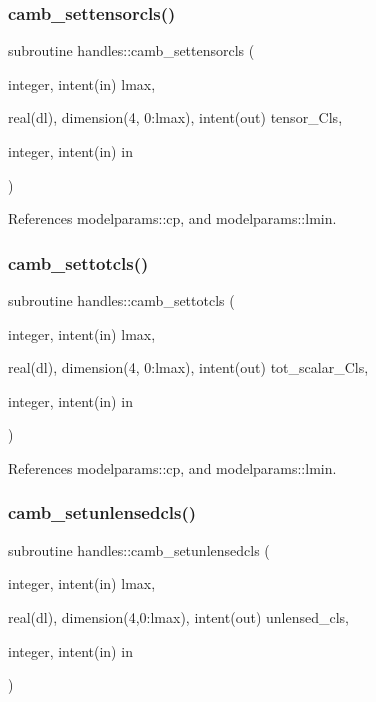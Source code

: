 \subsubsection{\texorpdfstring{camb\+\_\+settensorcls()}{camb\_settensorcls()}}
{\footnotesize\ttfamily subroutine handles\+::camb\+\_\+settensorcls (\begin{DoxyParamCaption}\item[{integer, intent(in)}]{lmax,  }\item[{real(dl), dimension(4, 0\+:lmax), intent(out)}]{tensor\+\_\+\+Cls,  }\item[{integer, intent(in)}]{in }\end{DoxyParamCaption})}



References modelparams\+::cp, and modelparams\+::lmin.

\mbox{\label{namespacehandles_aa9ec681801ce104b28add54fd9ee3d16}} 
\subsubsection{\texorpdfstring{camb\+\_\+settotcls()}{camb\_settotcls()}}
{\footnotesize\ttfamily subroutine handles\+::camb\+\_\+settotcls (\begin{DoxyParamCaption}\item[{integer, intent(in)}]{lmax,  }\item[{real(dl), dimension(4, 0\+:lmax), intent(out)}]{tot\+\_\+scalar\+\_\+\+Cls,  }\item[{integer, intent(in)}]{in }\end{DoxyParamCaption})}



References modelparams\+::cp, and modelparams\+::lmin.

\mbox{\label{namespacehandles_a275c2c9c895b79f63eef42b7fe81c842}} 
\subsubsection{\texorpdfstring{camb\+\_\+setunlensedcls()}{camb\_setunlensedcls()}}
{\footnotesize\ttfamily subroutine handles\+::camb\+\_\+setunlensedcls (\begin{DoxyParamCaption}\item[{integer, intent(in)}]{lmax,  }\item[{real(dl), dimension(4,0\+:lmax), intent(out)}]{unlensed\+\_\+cls,  }\item[{integer, intent(in)}]{in }\end{DoxyParamCaption})}



